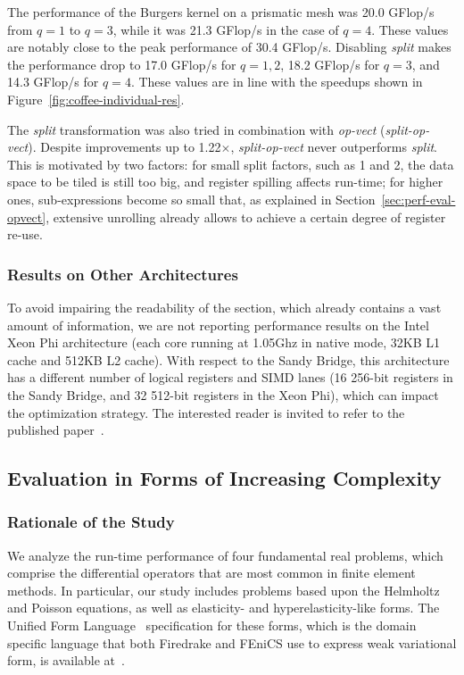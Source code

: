 The performance of the Burgers kernel on a prismatic mesh was 20.0 GFlop/s from $q=1$ to $q=3$, while it was 21.3 GFlop/s in the case of $q=4$. These values are notably close to the peak performance of 30.4 GFlop/s. Disabling \emph{split} makes the performance drop to 17.0 GFlop/s for $q=1, 2$, 18.2 GFlop/s for $q=3$,
and 14.3 GFlop/s for $q=4$. These values are in line with the speedups shown in Figure~\ref{fig:coffee-individual-res}.

The \emph{split} transformation was also tried in combination with \emph{op-vect} (\emph{split-op-vect}). Despite improvements up to 1.22$\times$, \emph{split-op-vect} never outperforms \emph{split}. This is motivated by two factors: for small split factors, such as 1 and 2, the data space to be tiled is still too big, and register spilling affects run-time; for higher ones, sub-expressions become so small that, as explained in Section~\ref{sec:perf-eval-opvect}, extensive unrolling already allows to achieve a certain degree of register re-use.

\subsubsection*{Results on Other Architectures}
To avoid impairing the readability of the section, which already contains a vast amount of information, we are not reporting performance results on the Intel Xeon Phi  architecture (each core running at 1.05Ghz in native mode, 32KB L1 cache and 512KB L2 cache). With respect to the Sandy Bridge, this architecture has a different number of logical registers and SIMD lanes (16 256-bit registers in the Sandy Bridge, and 32 512-bit registers in the Xeon Phi), which can impact the optimization strategy. The interested reader is invited to refer to the published paper~\citep{Luporini-coffee}.

\subsection{Evaluation in Forms of Increasing Complexity}
\label{sec:coffee-perfeval-allforms}

\subsubsection{Rationale of the Study}
\label{sec:coffee-allforms-rationale}
We analyze the run-time performance of four fundamental real problems, which comprise the differential operators that are most common in finite element methods. In particular, our study includes problems based upon the Helmholtz and Poisson equations, as well as elasticity- and hyperelasticity-like forms. The Unified Form Language~\cite{ufl} specification for these forms, which is the domain specific language that both Firedrake and FEniCS use to express weak variational form, is available at~\cite{ufl-code}. 

